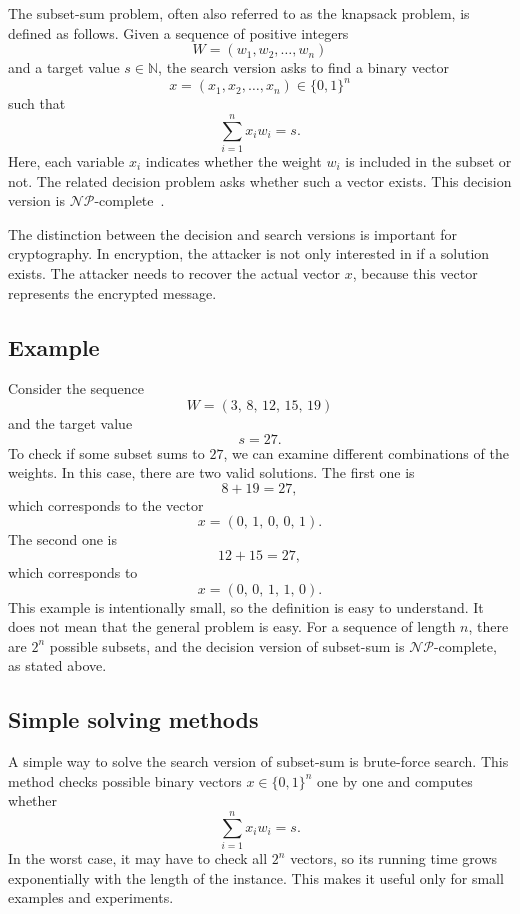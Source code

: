 The subset-sum problem, often also referred to as the knapsack problem, is
defined as follows. Given a sequence of positive integers
\[
W = (w_1, w_2, \dots, w_n)
\]
and a target value $s \in \mathbb{N}$, the search version asks to find a binary
vector
\[
x = (x_1, x_2, \dots, x_n) \in \{0,1\}^n
\]
such that
\[
\sum_{i=1}^{n} x_i w_i = s.
\]
Here, each variable $x_i$ indicates whether the weight $w_i$ is included in the
subset or not. The related decision problem asks whether such a vector exists.
This decision version is
$\mathcal{NP}$-complete~\cite[p.~223]{garey1979computers}.

The distinction between the decision and search versions is important for
cryptography. In encryption, the attacker is not only interested in if a
solution exists. The attacker needs to recover the actual vector $x$, because
this vector represents the encrypted message.~\cite[pp.~75--76]{OdlyzkoRiseFall}

\subsection*{Example}

Consider the sequence
\[
W = (3,\, 8,\, 12,\, 15,\, 19)
\]
and the target value
\[
s = 27.
\]
To check if some subset sums to $27$, we can examine different combinations
of the weights. In this case, there are two valid solutions. The first one is
\[
8 + 19 = 27,
\]
which corresponds to the vector
\[
x = (0,\,1,\,0,\,0,\,1).
\]
The second one is
\[
12 + 15 = 27,
\]
which corresponds to
\[
x = (0,\,0,\,1,\,1,\,0).
\]
This example is intentionally small, so the definition is easy to understand.
It does not mean that the general problem is easy. For a sequence of length
$n$, there are $2^n$ possible subsets, and the decision version of subset-sum
is $\mathcal{NP}$-complete, as stated above.

\subsection*{Simple solving methods}

A simple way to solve the search version of subset-sum is brute-force search.
This method checks possible binary vectors $x\in\{0,1\}^n$ one by one and
computes whether
\[
    \sum_{i=1}^{n} x_i w_i = s.
\]
In the worst case, it may have to check all $2^n$ vectors, so its running time
grows exponentially with the length of the instance. This makes it useful only
for small examples and experiments.

